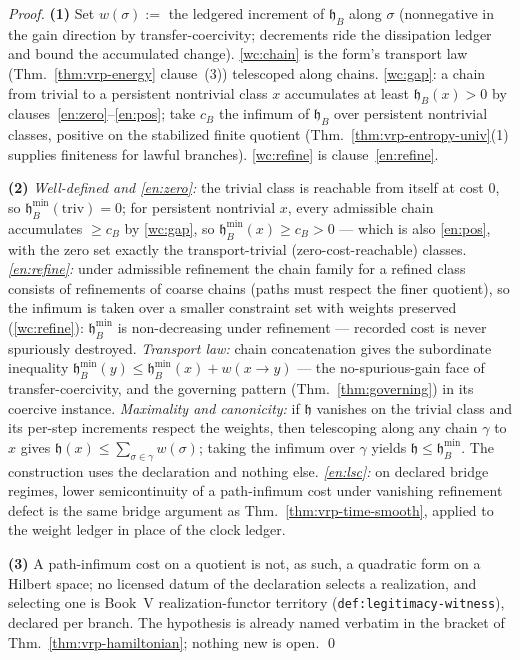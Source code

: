\documentclass[12pt,oneside]{amsbook}
\theoremstyle{plain}
\theoremstyle{definition}
\theoremstyle{remark}
\begin{document}
\begin{proof}
\textbf{(1)}  Set $w(\sigma) := $ the ledgered increment of
$\mathfrak{h}_B$ along $\sigma$ (nonnegative in the gain
direction by transfer-coercivity; decrements ride the dissipation
ledger and bound the accumulated change).  \ref{wc:chain} is the
form's transport law (Thm.~\ref{thm:vrp-energy} clause~(3))
telescoped along chains.  \ref{wc:gap}: a chain from trivial to a
persistent nontrivial class $x$ accumulates at least
$\mathfrak{h}_B(x) > 0$ by clauses~\ref{en:zero}--\ref{en:pos};
take $c_B$ the infimum of $\mathfrak{h}_B$ over persistent
nontrivial classes, positive on the stabilized finite quotient
(Thm.~\ref{thm:vrp-entropy-univ}(1) supplies finiteness for
lawful branches).  \ref{wc:refine} is clause~\ref{en:refine}.

\textbf{(2)}  \emph{Well-defined and \ref{en:zero}:}  the trivial
class is reachable from itself at cost $0$, so
$\mathfrak{h}_B^{\min}(\mathrm{triv}) = 0$; for persistent
nontrivial $x$, every admissible chain accumulates $\ge c_B$ by
\ref{wc:gap}, so $\mathfrak{h}_B^{\min}(x) \ge c_B > 0$ --- which
is also \ref{en:pos}, with the zero set exactly the
transport-trivial (zero-cost-reachable) classes.
\emph{\ref{en:refine}:}  under admissible refinement the chain
family for a refined class consists of refinements of coarse
chains (paths must respect the finer quotient), so the infimum is
taken over a smaller constraint set with weights preserved
(\ref{wc:refine}): $\mathfrak{h}_B^{\min}$ is non-decreasing
under refinement --- recorded cost is never spuriously destroyed.
\emph{Transport law:}  chain concatenation gives the subordinate
inequality
$\mathfrak{h}_B^{\min}(y) \le \mathfrak{h}_B^{\min}(x) +
w(x \to y)$ --- the no-spurious-gain face of transfer-coercivity,
and the governing pattern (Thm.~\ref{thm:governing}) in its
coercive instance.  \emph{Maximality and canonicity:}  if
$\mathfrak{h}$ vanishes on the trivial class and its per-step
increments respect the weights, then telescoping along any chain
$\gamma$ to $x$ gives
$\mathfrak{h}(x) \le \sum_{\sigma \in \gamma} w(\sigma)$; taking
the infimum over $\gamma$ yields
$\mathfrak{h} \le \mathfrak{h}_B^{\min}$.  The construction uses
the declaration and nothing else.  \emph{\ref{en:lsc}:}  on
declared bridge regimes, lower semicontinuity of a path-infimum
cost under vanishing refinement defect is the same bridge
argument as Thm.~\ref{thm:vrp-time-smooth}, applied to the weight
ledger in place of the clock ledger.

\textbf{(3)}  A path-infimum cost on a quotient is not, as such,
a quadratic form on a Hilbert space; no licensed datum of the
declaration selects a realization, and selecting one is Book~V
realization-functor territory
(\texttt{def:legitimacy-witness}), declared per branch.  The
hypothesis is already named verbatim in the bracket of
Thm.~\ref{thm:vrp-hamiltonian}; nothing new is open.  \qed
\end{proof}
\end{document}
